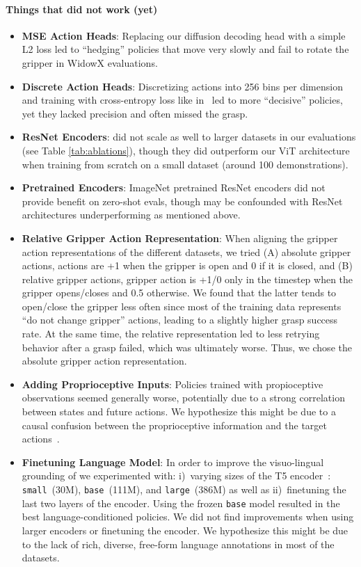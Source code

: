 \begin{appendices}
\paragraph{Things that did not work (yet)}
\begin{itemize}
    \item \textbf{MSE Action Heads}: Replacing our diffusion decoding head with a simple L2 loss led to ``hedging'' policies that move very slowly and \eg fail to rotate the gripper in WidowX evaluations.
    \item \textbf{Discrete Action Heads}: Discretizing actions into 256 bins per dimension and training with cross-entropy loss like in~\citet{brohan2022rt} led to more ``decisive'' policies, yet they lacked precision and often missed the grasp.
    \item \textbf{ResNet Encoders}: did not scale as well to larger datasets in our evaluations (see Table \ref{tab:ablations}), though they did outperform our ViT architecture when training from scratch on a small dataset (around 100 demonstrations).
    \item \textbf{Pretrained Encoders}: ImageNet pretrained ResNet encoders did not provide benefit on zero-shot evals, though may be confounded with ResNet architectures underperforming as mentioned above.
    \item \textbf{Relative Gripper Action Representation}: When aligning the gripper action representations of the different datasets, we tried (A) absolute gripper actions, \ie actions are +1 when the gripper is open and 0 if it is closed, and (B) relative gripper actions, \ie gripper action is +1/0 only in the timestep when the gripper opens/closes and 0.5 otherwise. We found that the latter tends to open/close the gripper less often since most of the training data represents ``do not change gripper'' actions, leading to a slightly higher grasp success rate. At the same time, the relative representation led to less retrying behavior after a grasp failed, which was ultimately worse. Thus, we chose the absolute gripper action representation.
    \item \textbf{Adding Proprioceptive Inputs}: Policies trained with propioceptive observations seemed generally worse, potentially due to a strong correlation between states and future actions. We hypothesize this might be due to a causal confusion between the proprioceptive information and
the target actions~\citep{de2019causal}.
    \item \textbf{Finetuning Language Model}: In order to improve the visuo-lingual grounding of \method{} we experimented with: i)~varying sizes of the T5 encoder~\citep{2020t5}: \texttt{small}~(30M), \texttt{base}~(111M), and \texttt{large}~(386M) as well as ii)~finetuning the last two layers of the encoder. Using the frozen \texttt{base} model resulted in the best language-conditioned policies. We did not find improvements when using larger encoders or finetuning the encoder. We hypothesize this might be due to the lack of rich, diverse, free-form language annotations in most of the datasets.
    

\end{itemize}
\end{appendices}
